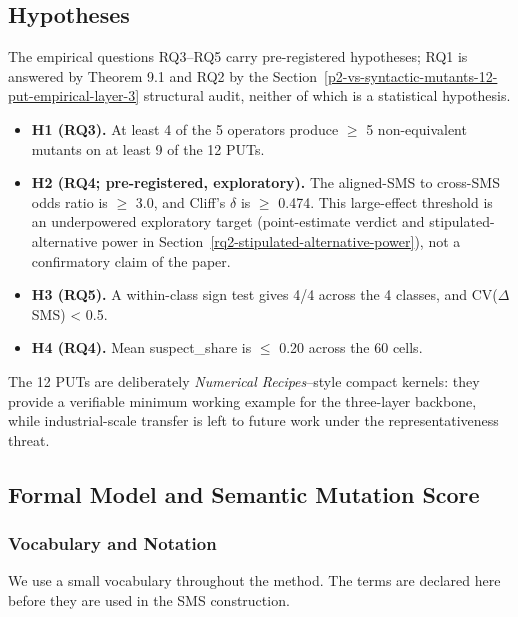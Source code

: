 \documentclass[12pt]{article}
\providecommand{\tightlist}{\setlength{\itemsep}{0pt}\setlength{\parskip}{0pt}}
\begin{document}
\subsection{Hypotheses}\label{hypotheses}

The empirical questions RQ3--RQ5 carry pre-registered hypotheses; RQ1 is
answered by Theorem 9.1 and RQ2 by the Section~\ref{p2-vs-syntactic-mutants-12-put-empirical-layer-3} structural audit, neither of
which is a statistical hypothesis.

\begin{itemize}
\tightlist
\item
  \textbf{H1 (RQ3).} At least 4 of the 5 operators produce $\geq$ 5 non-equivalent
  mutants on at least 9 of the 12 PUTs.
\item
  \textbf{H2 (RQ4; pre-registered, exploratory).} The aligned-SMS to
  cross-SMS odds ratio is $\geq$ 3.0, and Cliff's $\delta$ is $\geq$ 0.474.
  This large-effect threshold is an underpowered exploratory target
  (point-estimate verdict and stipulated-alternative power in Section~\ref{rq2-stipulated-alternative-power}), not
  a confirmatory claim of the paper.
\item
  \textbf{H3 (RQ5).} A within-class sign test gives 4/4 across the 4 classes,
  and CV($\Delta$SMS) \textless{} 0.5.
\item
  \textbf{H4 (RQ4).} Mean suspect\_share is $\leq$ 0.20 across the 60 cells.
\end{itemize}

The 12 PUTs are deliberately \emph{Numerical Recipes}--style compact
kernels: they provide a verifiable minimum working example for the
three-layer backbone, while industrial-scale transfer is left to future
work under the representativeness threat.


\subsection{Formal Model and Semantic Mutation Score}\label{notation-and-equivalence-judgement}

\subsubsection{Vocabulary and Notation}\label{vocabulary-inheritance}

We use a small vocabulary throughout the method. The terms are declared
here before they are used in the SMS construction.
\end{document}
